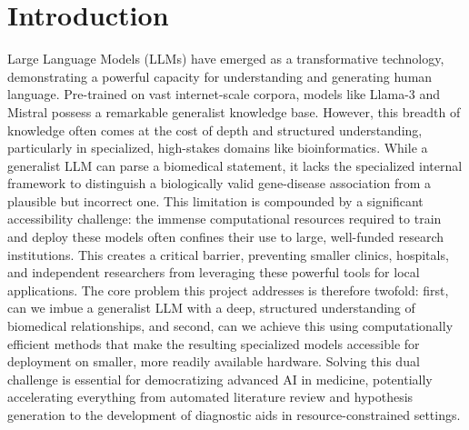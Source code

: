 \documentclass{article}
\begin{document}
\section{Introduction} 
Large Language Models (LLMs) have emerged as a transformative technology, demonstrating a powerful capacity for understanding and generating human language. Pre-trained on vast internet-scale corpora, models like Llama-3 and Mistral possess a remarkable generalist knowledge base. However, this breadth of knowledge often comes at the cost of depth and structured understanding, particularly in specialized, high-stakes domains like bioinformatics. While a generalist LLM can parse a biomedical statement, it lacks the specialized internal framework to distinguish a biologically valid gene-disease association from a plausible but incorrect one. This limitation is compounded by a significant accessibility challenge: the immense computational resources required to train and deploy these models often confines their use to large, well-funded research institutions. This creates a critical barrier, preventing smaller clinics, hospitals, and independent researchers from leveraging these powerful tools for local applications. The core problem this project addresses is therefore twofold: first, can we imbue a generalist LLM with a deep, structured understanding of biomedical relationships, and second, can we achieve this using computationally efficient methods that make the resulting specialized models accessible for deployment on smaller, more readily available hardware. Solving this dual challenge is essential for democratizing advanced AI in medicine, potentially accelerating everything from automated literature review and hypothesis generation to the development of diagnostic aids in resource-constrained settings.
\end{document}
